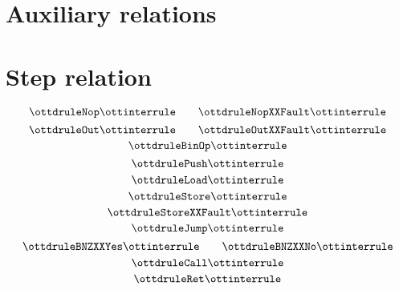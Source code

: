 \documentclass{article}
\begin{document}
\section*{Auxiliary relations}

\ottgrammartabular{
\ottformula\ottinterrule
}

\pagebreak
\section*{Step relation}


\small
\[ \ottdruleNop \ottinterrule \qquad \ottdruleNopXXFault \ottinterrule \]
\[ \ottdruleOut \ottinterrule \qquad  \ottdruleOutXXFault \ottinterrule \]
\[ \ottdruleBinOp \ottinterrule \] 
\[ \ottdrulePush \ottinterrule  \] 
\[ \ottdruleLoad \ottinterrule  \] 
\[ \ottdruleStore \ottinterrule \]
\[ \ottdruleStoreXXFault \ottinterrule \] 
\[ \ottdruleJump \ottinterrule  \] 
\[ \ottdruleBNZXXYes \ottinterrule \qquad  \ottdruleBNZXXNo \ottinterrule  \] 
\[ \ottdruleCall \ottinterrule  \] 
\[ \ottdruleRet \ottinterrule  \] 
\end{document}
